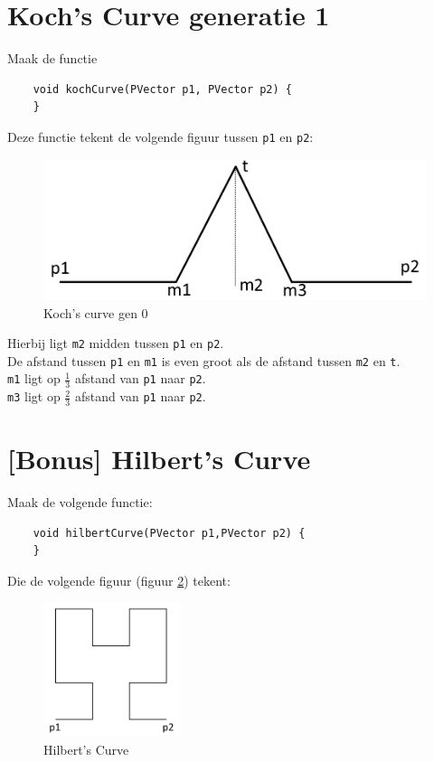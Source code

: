\documentclass{../qh_assignment}
\begin{document}
\section{Koch's Curve generatie 1}
Maak de functie
\begin{lstlisting}
	void kochCurve(PVector p1, PVector p2) {
	}
\end{lstlisting}
Deze functie tekent de volgende figuur tussen \texttt{p1} en \texttt{p2}:
\begin{figure}[H]
	\centering
	\includegraphics[width=\textwidth]{koch.png}
	\caption{Koch's curve gen 0}
	\label{fig:koch}
\end{figure}
\noindent
Hierbij ligt \texttt{m2} midden tussen \texttt{p1} en \texttt{p2}.\\
De afstand tussen \texttt{p1} en \texttt{m1} is even groot als de afstand tussen \texttt{m2} en \texttt{t}.\\
\texttt{m1} ligt op $\frac{1}{3}$ afstand van \texttt{p1} naar \texttt{p2}.\\
\texttt{m3} ligt op $\frac{2}{3}$ afstand van \texttt{p1} naar \texttt{p2}.\\

\newpage
\section{[Bonus] Hilbert's Curve}
Maak de volgende functie:
\begin{lstlisting}
	void hilbertCurve(PVector p1,PVector p2) {
	} 
\end{lstlisting}
Die de volgende figuur (figuur \ref{fig:koch}) tekent:
\begin{figure}[H]
	\centering
	\includegraphics[width=4cm]{hilbert.png}
	\caption{Hilbert's Curve}
	\label{fig:koch}
\end{figure}
\end{document}
